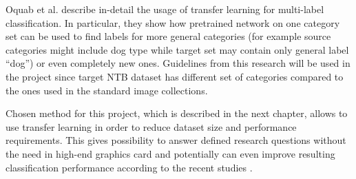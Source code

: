 Oquab et al. describe in-detail the usage of transfer learning for multi-label classification. In particular, they show how pretrained network on one category set can be used to find labels for more general categories (for example source categories might include dog type while target set may contain only general label ``dog'') or even completely new ones. \cite{Oquab2014LearningNetworks} Guidelines from this research will be used in the project since target NTB dataset has different set of categories compared to the ones used in the standard image collections.

Chosen method for this project, which is described in the next chapter, allows to use transfer learning in order to reduce dataset size and performance requirements. This gives possibility to answer defined research questions without the need in high-end graphics card and potentially can even improve resulting classification performance according to the recent studies \cite{Yosinski2014HowNetworks, Oquab2014LearningNetworks}.